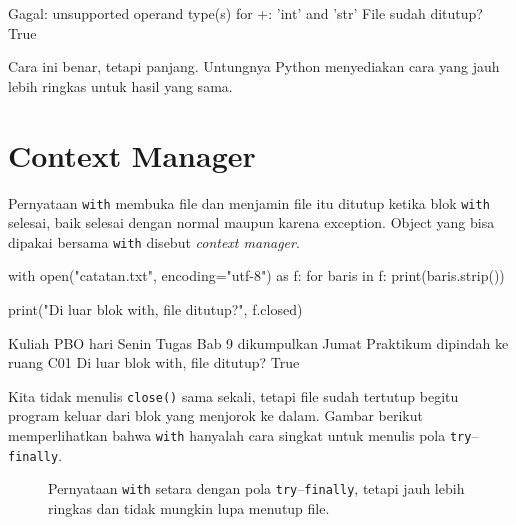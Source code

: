 \begin{keluaran}
Gagal: unsupported operand type(s) for +: 'int' and 'str'
File sudah ditutup? True
\end{keluaran}

Cara ini benar, tetapi panjang. Untungnya Python menyediakan cara yang jauh lebih ringkas untuk hasil yang sama.

\section{Context Manager}

Pernyataan \texttt{with} membuka file dan menjamin file itu ditutup ketika blok \texttt{with} selesai, baik selesai dengan normal maupun karena exception. Object yang bisa dipakai bersama \texttt{with} disebut \emph{context manager}.

\begin{kode}
with open("catatan.txt", encoding="utf-8") as f:
    for baris in f:
        print(baris.strip())

print("Di luar blok with, file ditutup?", f.closed)
\end{kode}

\begin{keluaran}
Kuliah PBO hari Senin
Tugas Bab 9 dikumpulkan Jumat
Praktikum dipindah ke ruang C01
Di luar blok with, file ditutup? True
\end{keluaran}

Kita tidak menulis \texttt{close()} sama sekali, tetapi file sudah tertutup begitu program keluar dari blok yang menjorok ke dalam. Gambar berikut memperlihatkan bahwa \texttt{with} hanyalah cara singkat untuk menulis pola \texttt{try}--\texttt{finally}.

\begin{figure}[htbp]
\centering
{}
\caption{Pernyataan \texttt{with} setara dengan pola \texttt{try}--\texttt{finally}, tetapi jauh lebih ringkas dan tidak mungkin lupa menutup file.}
\end{figure}

